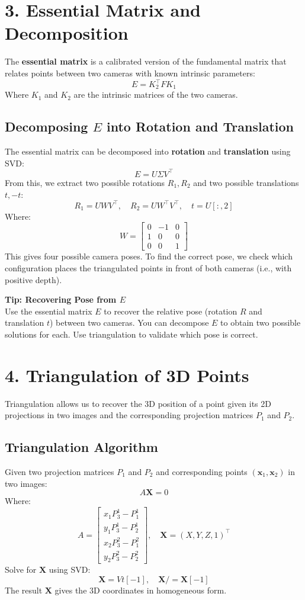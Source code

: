 \documentclass[a4paper,10pt]{article}
\begin{document}
\section*{3. Essential Matrix and Decomposition}

The \textbf{essential matrix} is a calibrated version of the fundamental matrix that relates points between two cameras with known intrinsic parameters:
\[
E = K_2^\top F K_1
\]
Where $K_1$ and $K_2$ are the intrinsic matrices of the two cameras.

\subsection*{Decomposing $E$ into Rotation and Translation}
The essential matrix can be decomposed into \textbf{rotation} and \textbf{translation} using SVD:
\[
E = U \Sigma V^\top
\]
From this, we extract two possible rotations $R_1, R_2$ and two possible translations $t, -t$:
\[
R_1 = U W V^\top, \quad R_2 = U W^\top V^\top, \quad t = U[:, 2]
\]
Where:
\[
W = \begin{bmatrix} 0 & -1 & 0 \\ 1 & 0 & 0 \\ 0 & 0 & 1 \end{bmatrix}
\]
This gives four possible camera poses. To find the correct pose, we check which configuration places the triangulated points in front of both cameras (i.e., with positive depth).

\textbf{Tip: Recovering Pose from $E$} \\
Use the essential matrix $E$ to recover the relative pose (rotation $R$ and translation $t$) between two cameras. You can decompose $E$ to obtain two possible solutions for each. Use triangulation to validate which pose is correct.

\section*{4. Triangulation of 3D Points}

Triangulation allows us to recover the 3D position of a point given its 2D projections in two images and the corresponding projection matrices $P_1$ and $P_2$.

\subsection*{Triangulation Algorithm}
Given two projection matrices $P_1$ and $P_2$ and corresponding points $(\mathbf{x}_1, \mathbf{x}_2)$ in two images:
\[
A \mathbf{X} = 0
\]
Where:
\[
A = \begin{bmatrix} x_1 P_3^1 - P_1^1 \\ y_1 P_3^1 - P_2^1 \\ x_2 P_3^2 - P_1^2 \\ y_2 P_3^2 - P_2^2 \end{bmatrix}, \quad \mathbf{X} = (X, Y, Z, 1)^\top
\]
Solve for $\mathbf{X}$ using SVD:
\[
\mathbf{X} = Vt[-1], \quad \mathbf{X} /= \mathbf{X}[-1]
\]
The result $\mathbf{X}$ gives the 3D coordinates in homogeneous form.
\end{document}
